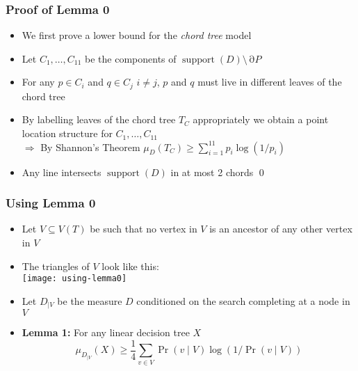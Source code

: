 \documentclass{beamer}
\DeclareMathOperator{\support}{support}
\DeclareMathOperator{\boundary}{\partial}
\begin{document}
\frame
{
	\frametitle{Proof of Lemma 0}
        \begin{itemize}
           \item<1->We first prove a lower bound for the \emph{chord tree} model\\
           \item<2->Let $C_1,\ldots,C_{11}$ be the components of 
               $\support(D)\setminus \boundary P$

           \item<3->For any $p\in C_i$ and $q\in C_j$ $i\neq j$, $p$ and $q$
               must live in different leaves of the chord tree

           \item<4->By labelling leaves of the chord tree $T_C$
		appropriately we obtain a
               point location structure for $C_1,\ldots,C_{11}$ \\
           $\Rightarrow$ By Shannon's Theorem $\mu_D(T_C) \ge \sum_{i=1}^{11}p_i\log (1/p_i)$
           \item<5->Any line intersects $\support(D)$ in at most 2 chords
		\hfill{\qed}
        \end{itemize}
}


\frame
{
    \frametitle{Using Lemma 0}
    \begin{itemize}
	\item<1-> Let $V\subseteq V(T)$ be such that no vertex in
$V$ is an ancestor of any other vertex in $V$
        \item<2-> The triangles of $V$ look like this:\\
	\texttt{[image: using-lemma0]}
        \item<3->Let $D_{\mid V}$ be the measure $D$ conditioned on the
search completing at a node in $V$
        \item<4->\textbf{Lemma 1:} For any linear decision tree $X$
        \[ \mu_{D_{\mid V}}(X) \ge \frac{1}{4}\sum_{v\in V} \Pr(v\mid V)\log (1/\Pr(v\mid V))
         \]
    \end{itemize}
}

\end{document}
